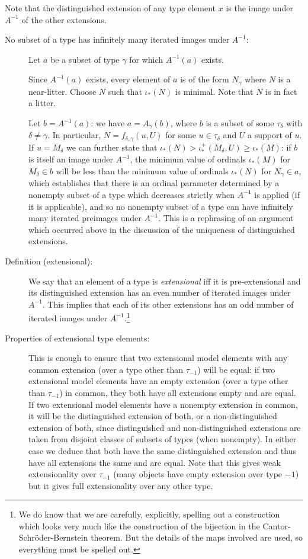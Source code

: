 \documentclass[112pt]{article}
\begin{document}
Note that the distinguished extension of any type element $x$ is the image under $A^{-1}$ of the other extensions.

\begin{description}

\item[No subset of a type has infinitely many iterated images under $A^{-1}$:]  Let $a$ be a subset of type $\gamma$ for which $A^{-1}(a)$ exists.  

Since $A^{-1}(a)$ exists, every element of $a$ is of the form $N_\gamma$ where $N$ is a near-litter.  Choose $N$ such that $\iota_*(N)$ is minimal.  Note that $N$ is in fact a litter.

Let $b = A^{-1}(a)$:  we have $a = A_\gamma(b)$, where $b$ is a subset of some $\tau_\delta$ with $\delta \neq \gamma$.  In particular, $N = f_{\delta,\gamma}(u,U)$ for
some $u \in \tau_\delta$ and $U$ a support of $u$.  If $u=M_\delta$ we can further state that $\iota_*(N) > \iota^+_*(M_\delta,U) \geq \iota_*(M)$:  if $b$ is itself an image under $A^{-1}$, the minimum value of ordinals $\iota_*(M)$ for $M_\delta \in b$ will be less than the minimum value of ordinals $\iota_*(N)$ for $N_\gamma\in a$, which establishes that there is an ordinal parameter determined by a nonempty subset of a type which decreases strictly when $A^{-1}$ is applied (if it is applicable), and so no nonempty subset of a type
can have infinitely many iterated preimages under $A^{-1}$.  This is a rephrasing of an argument which occurred above in the discussion of the uniqueness of distinguished extensions.

\item[Definition (extensional):]  We say that an element of a type is {\em extensional\/} iff
it is pre-extensional and its distinguished extension has an even number of iterated images under $A^{-1}$.
This implies that each of its other extensions has an odd number of iterated images under $A^{-1}$.\footnote{We do know that we are carefully, explicitly, spelling out a construction which looks very much
like the construction of the bijection in the Cantor-Schr\"oder-Bernstein theorem.  But the details of the maps involved are used, so everything must be spelled out.}

\item[Properties of extensional type elements:]   This is enough to ensure that two extensional model elements with any common extension (over a type other than $\tau_{-1}$) will be equal:  if two extensional model elements have an empty extension (over a type other than $\tau_{-1}$) in common, they both have all extensions empty and are equal.  If two extensional model elements have a nonempty extension in common, it will be the distinguished extension of both, or a non-distinguished extension of both, since distinguished and non-distinguished extensions are taken from disjoint classes of subsets of types (when nonempty).
In either case we deduce that both have the same distinguished extension and thus have all extensions the same and are equal.  Note that this gives weak extensionality over $\tau_{-1}$ (many objects have empty extension over type $-1$) but it gives full extensionality over any other type.


\end{description}
\end{document}
